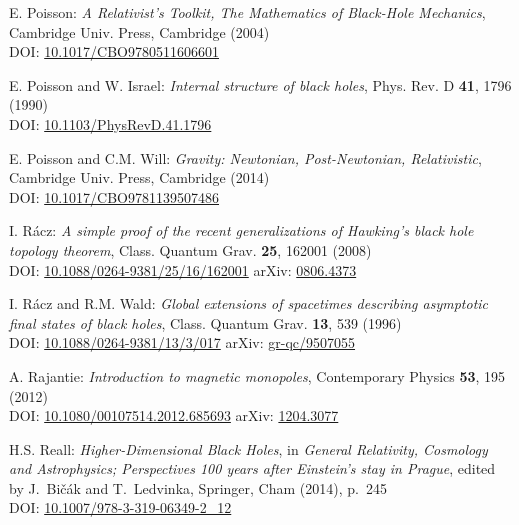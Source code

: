 \begin{thebibliography}{123}
E. Poisson: \emph{A Relativist's Toolkit,
The Mathematics of Black-Hole Mechanics},
Cambridge Univ. Press, Cambridge (2004) \\
DOI: \href{https://doi.org/10.1017/CBO9780511606601}{10.1017/CBO9780511606601}

E. Poisson and W. Israel: {\em Internal structure of black holes},
Phys. Rev. D {\bf 41}, 1796 (1990) \\
DOI: \href{https://doi.org/10.1103/PhysRevD.41.1796}{10.1103/PhysRevD.41.1796}

E. Poisson and C.M. Will: {\em Gravity: Newtonian, Post-Newtonian, Relativistic},
Cambridge Univ. Press, Cambridge (2014) \\
DOI: \href{https://doi.org/10.1017/CBO9781139507486}{10.1017/CBO9781139507486}

I. R\'acz:
{\em A simple proof of the recent generalizations of Hawking's black hole topology theorem},
Class. Quantum Grav. {\bf 25}, 162001 (2008)\\
DOI: \href{https://doi.org/10.1088/0264-9381/25/16/162001}{10.1088/0264-9381/25/16/162001}\hfill
arXiv: \href{https://arxiv.org/abs/0806.4373}{0806.4373}

I. R\'acz and R.M. Wald:
{\em Global extensions of spacetimes describing asymptotic final states of black holes},
Class. Quantum Grav. {\bf 13}, 539 (1996)\\
DOI: \href{https://doi.org/10.1088/0264-9381/13/3/017}{10.1088/0264-9381/13/3/017}\hfill
arXiv: \href{https://arxiv.org/abs/gr-qc/9507055}{gr-qc/9507055}

A. Rajantie:
{\em Introduction to magnetic monopoles},
Contemporary Physics {\bf 53}, 195 (2012)\\
DOI: \href{https://doi.org/10.1080/00107514.2012.685693}{10.1080/00107514.2012.685693}\hfill
arXiv: \href{https://arxiv.org/abs/1204.3077}{1204.3077}

H.S. Reall:
{\em Higher-Dimensional Black Holes},
in {\em  General Relativity, Cosmology and Astrophysics; Perspectives 100 years after Einstein's stay in Prague}, edited by J.~Bičák and T.~Ledvinka,
Springer, Cham (2014), p.~245\\
DOI: \href{https://doi.org/10.1007/978-3-319-06349-2_12}{10.1007/978-3-319-06349-2\_12}


\end{thebibliography}
